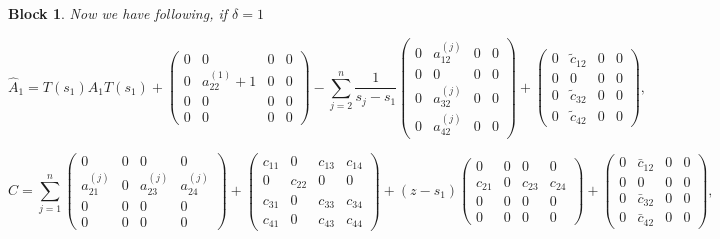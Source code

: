 \documentclass[12pt]{article}
\newtheorem{block}{Block}
\begin{document}
\begin{block}
Now we have following, if $\delta = 1$

\[
    \hat{A}_1 = T(s_1) A_1 T(s_1)
    +\begin{pmatrix}
        0 & 0 & 0 & 0 \\[10pt]
        0 & a_{22}^{(1)} + 1 & 0 & 0\\[10pt]
        0 & 0 & 0 & 0 \\[10pt]
        0 & 0 & 0 & 0
    \end{pmatrix}
    -\sum_{j=2}^{n} \frac{1}{s_j-s_1}\begin{pmatrix}
        0 & a_{12}^{(j)} & 0 & 0 \\[10pt]
        0 & 0 & 0 & 0 \\[10pt]
        0 & a_{32}^{(j)} & 0 & 0 \\[10pt]
        0 & a_{42}^{(j)} & 0 & 0
    \end{pmatrix}
    + \begin{pmatrix}
        0 & \tilde{c}_{12}  & 0 & 0 \\[10pt]
        0 & 0 & 0 & 0 \\[10pt]
        0 & \tilde{c}_{32} & 0 & 0 \\[10pt]
        0 & \tilde{c}_{42} & 0 & 0
    \end{pmatrix},
\]

\[
    \hat{C} = \sum_{j=1}^{n} \begin{pmatrix}
        0 & 0 & 0 & 0 \\[10pt]
        a_{21}^{(j)} & 0 & a_{23}^{(j)}  & a_{24}^{(j)}\\[10pt]
        0 & 0 & 0 & 0 \\[10pt]
        0 & 0 & 0 & 0
    \end{pmatrix}
    + \begin{pmatrix}
        c_{11} & 0 & c_{13} & c_{14} \\[10pt]
        0 & c_{22} & 0 & 0 \\[10pt]
        c_{31} & 0 & c_{33} & c_{34} \\[10pt]
        c_{41} & 0 & c_{43} & c_{44}
    \end{pmatrix}
    +(z-s_1) \begin{pmatrix}
        0 & 0 & 0 & 0 \\[10pt]
        c_{21} & 0 & c_{23} & c_{24} \\[10pt]
        0 & 0 & 0 & 0 \\[10pt]
        0 & 0 & 0 & 0
    \end{pmatrix}
    +\begin{pmatrix}
        0 & \bar{c}_{12}  & 0 & 0 \\[10pt]
        0 & 0 & 0 & 0 \\[10pt]
        0 & \bar{c}_{32} & 0 & 0 \\[10pt]
        0 & \bar{c}_{42} & 0 & 0
    \end{pmatrix},
\]


\end{block}
\end{document}
